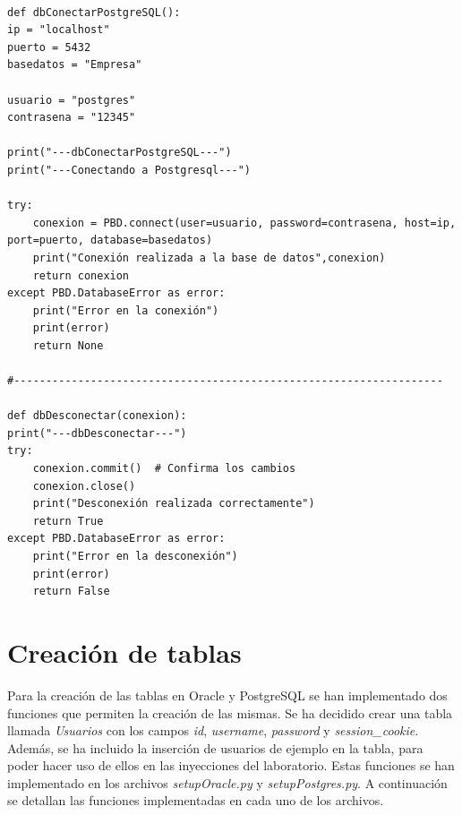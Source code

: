 \documentclass[a4paper,12pt]{article}
\begin{document}
\begin{lstlisting}
    
def dbConectarPostgreSQL():
ip = "localhost"
puerto = 5432
basedatos = "Empresa"

usuario = "postgres"
contrasena = "12345"

print("---dbConectarPostgreSQL---")
print("---Conectando a Postgresql---")

try:
    conexion = PBD.connect(user=usuario, password=contrasena, host=ip, port=puerto, database=basedatos)
    print("Conexión realizada a la base de datos",conexion)
    return conexion
except PBD.DatabaseError as error:
    print("Error en la conexión")
    print(error)
    return None

#-------------------------------------------------------------------

def dbDesconectar(conexion):
print("---dbDesconectar---")
try:
    conexion.commit()  # Confirma los cambios
    conexion.close()
    print("Desconexión realizada correctamente")
    return True
except PBD.DatabaseError as error:
    print("Error en la desconexión")
    print(error)
    return False
\end{lstlisting}
\section{Creación de tablas}
Para la creación de las tablas en Oracle y PostgreSQL se han implementado dos funciones que permiten la creación de las mismas.
Se ha decidido crear una tabla llamada \textit{Usuarios} con los campos \textit{id}, \textit{username}, \textit{password} y \textit{session\_cookie}.
Además, se ha incluido la inserción de usuarios de ejemplo en la tabla, para poder hacer uso de ellos en las inyecciones del laboratorio.
Estas funciones se han implementado en los archivos \textit{setupOracle.py} y \textit{setupPostgres.py}. 
A continuación se detallan las funciones implementadas en cada uno de los archivos.
\end{document}
